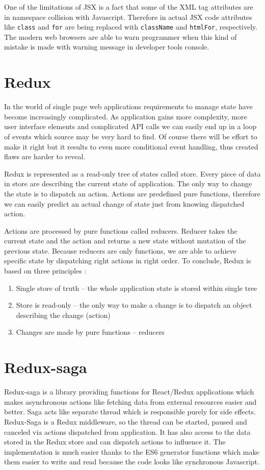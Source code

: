 One of the limitations of JSX is a fact that some of the XML tag attributes are in namespace collision with Javascript. Therefore in actual JSX code attributes like \texttt{class} and \texttt{for} are being replaced with \texttt{className} and \texttt{htmlFor}, respectively. The modern web browsers are able to warn programmer when this kind of mistake is made with warning message in developer tools console. 

\section{Redux}
In the world of single page web applications requirements to manage state have become increasingly complicated. As application gains more complexity, more user interface elements and complicated API calls we can easily end up in a loop of events which source may be very hard to find. Of course there will be effort to make it right but it results to even more conditional event handling, thus created flaws are harder to reveal.

Redux is represented as a read-only tree of states called store. Every piece of data in store are describing the current state of application. The only way to change the state is to dispatch an action. Actions are predefined pure functions, therefore we can easily predict an actual change of state just from knowing dispatched action.

Actions are processed by pure functions called reducers. Reducer takes the current state and the action and returns a new state without mutation of the previous state. Because reducers are only functions, we are able to achieve specific state by dispatching right actions in right order. To conclude, Redux is based on three principles \cite{treePrinciples}:
\begin{enumerate}
\item Single store of truth -- the whole application state is stored within single tree
\item Store is read-only -- the only way to make a change is to dispatch an object describing the change (action)
\item Changes are made by pure functions -- reducers 
\end{enumerate}

\section{Redux-saga}
Redux-saga \cite{redux-saga} is a library providing functions for React/Redux applications which makes asynchronous actions like fetching data from external resources easier and better. Saga acts like separate thread which is responsible purely for side effects. Redux-Saga is a Redux middleware, so the thread can be started, paused and canceled via actions dispatched from application. It has also access to the data stored in the Redux store and can dispatch actions to influence it. The implementation is much easier thanks to the ES6 generator functions which make them easier to write and read because the code looks like synchronous Javascript.

